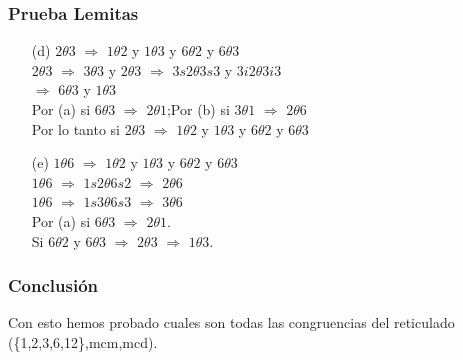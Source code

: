 \documentclass{beamer}
\begin{document}
\begin{frame}
\frametitle{Prueba Lemitas}
\begin{enumerate}
\item[(d)] $2\theta 3$ $\Rightarrow$ $1\theta 2$ y $1\theta 3$ y $6\theta 2$
       y $6\theta 3$\\
       $2\theta 3$ $\Rightarrow$ $3\theta 3$ y $2\theta 3$ $\Rightarrow$
       $3s2\theta 3s3$ y $3i2\theta 3i3$\\ 
       $\Rightarrow$ $6\theta 3$ y $1\theta 3$\\
       Por (a) si $6\theta 3$ $\Rightarrow$ $2\theta 1$;Por (b) si $3\theta 1$
       $\Rightarrow$ $2\theta 6$\\
       Por lo tanto si $2\theta 3$ $\Rightarrow$ $1\theta 2$ y $1\theta 3$ y $6\theta 2$
       y $6\theta 3$\\

\item[(e)] $1\theta 6$ $\Rightarrow$ $1\theta 2$ y $1\theta 3$ y $6\theta 2$
       y $6\theta 3$\\
       $1\theta 6$ $\Rightarrow$ $1s2\theta 6s2$ $\Rightarrow$ $2\theta 6$\\
       $1\theta 6$ $\Rightarrow$ $1s3\theta 6s3$ $\Rightarrow$ $3\theta 6$\\
       Por (a) si $6\theta 3$ $\Rightarrow$ $2\theta 1$.\\
       Si $6\theta 2$ y $6\theta 3$ $\Rightarrow$ $2\theta 3$
       $\Rightarrow$ $1\theta 3$.
\end{enumerate}
\end{frame}

\begin{frame}
\frametitle{Conclusi\'on}
Con esto hemos probado cuales son todas las congruencias del reticulado (\{1,2,3,6,12\},mcm,mcd). 
\end{frame}
\end{document}
